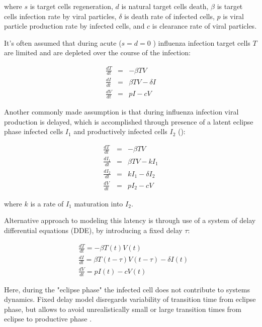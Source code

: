 where $s$ is target cells regeneration, $d$ is natural target cells death, $\beta$ is target cells infection rate by viral particles, $\delta$ is death rate of infected cells, $p$ is viral particle production rate by infected cells, and $c$ is clearance rate of viral particles.

It's often assumed that during acute ($s = d = 0$ \cite{baccam2006kinetics}) influenza infection target cells $T$ are limited and are depleted over the course of the infection:

\begin{equation}
\begin{array}{rcl}
\frac{dT}{dt} &=& - \beta T V \\
\frac{dI}{dt} &=& \beta T V - \delta I \\
\frac{dV}{dt} &=& p I - c V
\end{array}
\end{equation}

Another commonly made assumption is that during influenza infection viral production is delayed, which is accomplished through presence of a latent eclipse phase infected cells $I_1$ and productively infected cells $I_2$ (\cite{baccam2006kinetics, smith2011effect}):

\begin{equation}
\begin{array}{rcl}
\frac{dT}{dt} &=& - \beta T V \\
\frac{dI_1}{dt} &=& \beta T V - k I_1 \\
\frac{dI_2}{dt} &=& k I_1 - \delta I_2 \\
\frac{dV}{dt} &=& p I_2 - c V
\end{array}
\end{equation}

where $k$ is a rate of $I_1$ maturation into $I_2$.

Alternative approach to modeling this latency is through use of a system of delay differential equations (DDE), by introducing a fixed delay $\tau$:

\begin{equation}
\begin{array}{rcl}
&\frac{dT}{dt} = - \beta T(t) V(t) \\
&\frac{dI}{dt} = \beta T(t-\tau) V(t-\tau) - \delta I(t) \\
&\frac{dV}{dt} = p I(t) - c V(t)
\end{array}
\end{equation}

Here, during the "eclipse phase" the infected cell does not contribute to systems dynamics. Fixed delay model disregards variability of transition time from eclipse phase, but allows to avoid unrealistically small or large transition times from eclipse to productive phase \cite{beauchemin2008modeling}.

